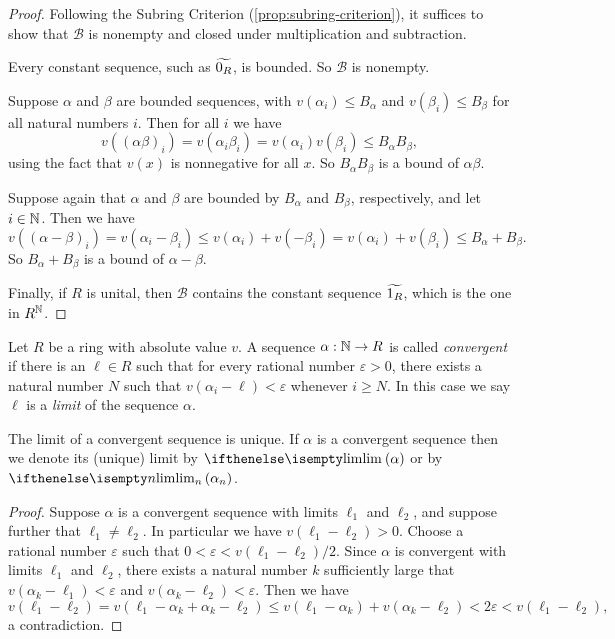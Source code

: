 \begin{proof}
Following the Subring Criterion (\ref{prop:subring-criterion}), it suffices to show that \(\mathcal{B}\) is nonempty and closed under multiplication and subtraction.
\begin{inlineproplist}
\item Every constant sequence, such as \(\widetilde{0_R}\), is bounded.
So \(\mathcal{B}\) is nonempty.
\item Suppose \(\alpha\) and \(\beta\) are bounded sequences, with \(v(\alpha_i) \leq B_\alpha\) and \(v(\beta_i) \leq B_\beta\) for all natural numbers \(i\).
Then for all \(i\) we have  \[ v((\alpha\beta)_i) = v(\alpha_i \beta_i) = v(\alpha_i)v(\beta_i) \leq B_\alpha B_\beta, \] using the fact that \(v(x)\) is nonnegative for all \(x\).
So \(B_\alpha B_\beta\) is a bound of \(\alpha\beta\).
\item Suppose again that \(\alpha\) and \(\beta\) are bounded by \(B_\alpha\) and \(B_\beta\), respectively, and let \(i \in \mathbb{N}\).
Then we have \[ v((\alpha - \beta)_i) = v(\alpha_i - \beta_i) \leq v(\alpha_i) + v(-\beta_i) = v(\alpha_i) + v(\beta_i) \leq B_\alpha + B_\beta. \] So \(B_\alpha + B_\beta\) is a bound of \(\alpha - \beta\).
\end{inlineproplist}
Finally, if \(R\) is unital, then \(\mathcal{B}\) contains the constant sequence \(\widetilde{1_R}\), which is the one in \(R^{\mathbb{N}}\).
\end{proof}

\begin{dfn}
Let \(R\) be a ring with absolute value \(v\).
A sequence \(\alpha : \mathbb{N} \rightarrow R\) is called \emph{convergent} if there is an \(\ell \in R\) such that for every rational number \(\varepsilon > 0\), there exists a natural number \(N\) such that \(v(\alpha_i - \ell) < \varepsilon\) whenever \(i \geq N\).
In this case we say \(\ell\) is a \emph{limit} of the sequence \(\alpha\).
\end{dfn}

\begin{prop}
The limit of a convergent sequence is unique.
If \(\alpha\) is a convergent sequence then we denote its (unique) limit by \(\LIM{\alpha}\) or by \(\LIM[n]{\alpha_n}\).
\end{prop}

\begin{proof}
Suppose \(\alpha\) is a convergent sequence with limits \(\ell_1\) and \(\ell_2\), and suppose further that \(\ell_1 \neq \ell_2\).
In particular we have \(v(\ell_1 - \ell_2) > 0\).
Choose a rational number \(\varepsilon\) such that \(0 < \varepsilon < v(\ell_1 - \ell_2)/2\).
Since \(\alpha\) is convergent with limits \(\ell_1\) and \(\ell_2\), there exists a natural number \(k\) sufficiently large that \(v(\alpha_k - \ell_1) < \varepsilon\) and \(v(\alpha_k - \ell_2) < \varepsilon\).
Then we have \[ v(\ell_1 - \ell_2) = v(\ell_1 - \alpha_k + \alpha_k - \ell_2) \leq v(\ell_1 - \alpha_k) + v(\alpha_k - \ell_2) < 2\varepsilon < v(\ell_1 - \ell_2), \] a contradiction.
\end{proof}

